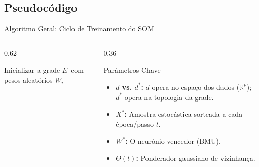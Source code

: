 \documentclass[aspectratio=169]{beamer}
\begin{document}
	\subsection{Pseudocódigo}
	\begin{frame}{Algoritmo Geral: Ciclo de Treinamento do SOM}
		\begin{columns}[T]
			\begin{column}{0.62\textwidth}
				\begin{algorithm}[H]
					\caption{Treinamento do SOM Clássico}
					Inicializar a grade $E$\ com pesos aleatórios $W_i$\;
				\end{algorithm}
			\end{column}
			
			\begin{column}{0.36\textwidth}
				\begin{block}{Parâmetros-Chave}
					\begin{itemize}
						\item \textbf{$d$ vs. $d^*$:} $d$ opera no espaço dos dados ($\mathbb{R}^p$); $d^*$ opera na topologia da grade.
						\item \textbf{$X^*$:} Amostra estocástica sorteada a cada época/passo $t$.
						\item \textbf{$W^*$:} O neurônio vencedor (BMU).
						\item \textbf{$\Theta(t)$:} Ponderador gaussiano de vizinhança.
					\end{itemize}
				\end{block}
			\end{column}
		\end{columns}
	\end{frame}
	
\end{document}

